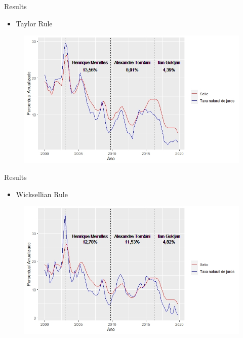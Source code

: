 \documentclass[9pt]{beamer}
\begin{document}
\begin{frame}{Results}
\begin{itemize}
    \item Taylor Rule
\end{itemize}
\begin{figure}[H]
\centering
\includegraphics[scale=0.60]{Figuras/ModeloA.jpeg}
\end{figure}

\end{frame}
\begin{frame}{Results}
\begin{itemize}
    \item Wicksellian Rule 
\end{itemize}
\begin{figure}[H]
\centering
\includegraphics[scale=0.60]{Figuras/ModeloB.jpeg}
\end{figure}

\end{frame}
\end{document}

